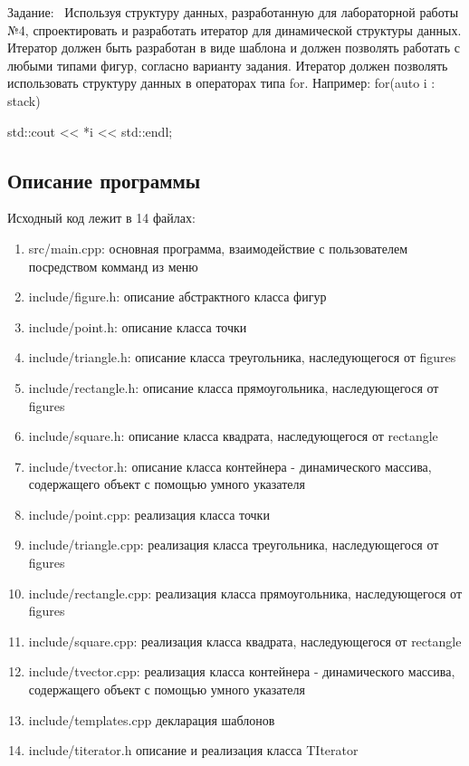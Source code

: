 \documentclass[12pt]{article}
\begin{document}
Задание: \
Используя структуру данных, разработанную для лабораторной работы №4, спроектировать и
разработать итератор для динамической структуры данных.\newline
Итератор должен быть разработан в виде шаблона и должен позволять работать с любыми
типами фигур, согласно варианту задания.\newline
Итератор должен позволять использовать структуру данных в операторах типа for. Например:\newline
for(auto i : stack) {\newline
std::cout << *i << std::endl;

\subsection*{Описание программы}

Исходный код лежит в 14 файлах:
\begin{enumerate}
\item src/main.cpp: основная программа, взаимодействие с пользователем посредством комманд из меню

\item include/figure.h:    описание абстрактного класса фигур

\item include/point.h:     описание класса точки
\item include/triangle.h:  описание класса треугольника, наследующегося от figures
\item include/rectangle.h: описание класса прямоугольника, наследующегося от figures
\item include/square.h:    описание класса квадрата, наследующегося от rectangle
\item include/tvector.h:   описание класса контейнера - динамического массива, содержащего объект с помощью умного указателя

\item include/point.cpp:     реализация класса точки
\item include/triangle.cpp:  реализация класса треугольника, наследующегося от figures
\item include/rectangle.cpp: реализация класса прямоугольника, наследующегося от figures
\item include/square.cpp:    реализация класса квадрата, наследующегося от rectangle
\item include/tvector.cpp:   реализация класса контейнера - динамического массива, содержащего объект с помощью умного указателя
\item include/templates.cpp  декларация шаблонов
\item include/titerator.h    описание и реализация класса TIterator


\end{enumerate}}
\end{document}
